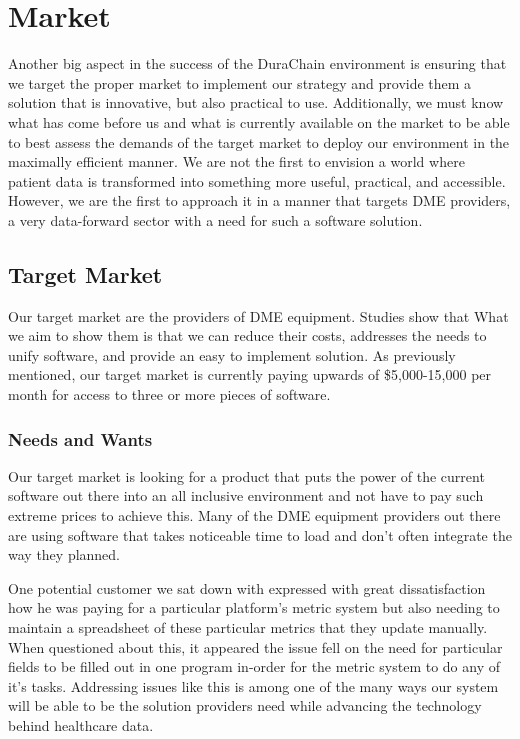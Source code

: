 \documentclass[12pt]{article}
\begin{document}
\section{Market}
Another big aspect in the success of the DuraChain environment is ensuring that we target the proper market to implement our strategy and provide them a solution that is innovative, but also practical to use. Additionally, we must know what has come before us and what is currently available on the market to be able to best assess the demands of the target market to deploy our environment in the maximally efficient manner. We are not the first to envision a world where patient data is transformed into something more useful, practical, and accessible. However, we are the first to approach it in a manner that targets DME providers, a very data-forward sector with a need for such a software solution.

  \subsection{Target Market}
  Our target market are the providers of DME equipment. Studies show that What we aim to show them is that we can reduce their costs, addresses the needs to unify software, and provide an easy to implement solution. As previously mentioned, our target market is currently paying upwards of \$5,000-15,000 per month for access to three or more pieces of software.

    \subsubsection{Needs and Wants}
    Our target market is looking for a product that puts the power of the current software out there into an all inclusive environment and not have to pay such extreme prices to achieve this. Many of the DME equipment providers out there are using software that takes noticeable time to load and don’t often integrate the way they planned.

    One potential customer we sat down with expressed with great dissatisfaction how he was paying for a particular platform’s metric system but also needing to maintain a spreadsheet of these particular metrics that they update manually. When questioned about this, it appeared the issue fell on the need for particular fields to be filled out in one program in-order for the metric system to do any of it’s tasks. Addressing issues like this is among one of the many ways our system will be able to be the solution providers need while advancing the technology behind healthcare data.
\end{document}
